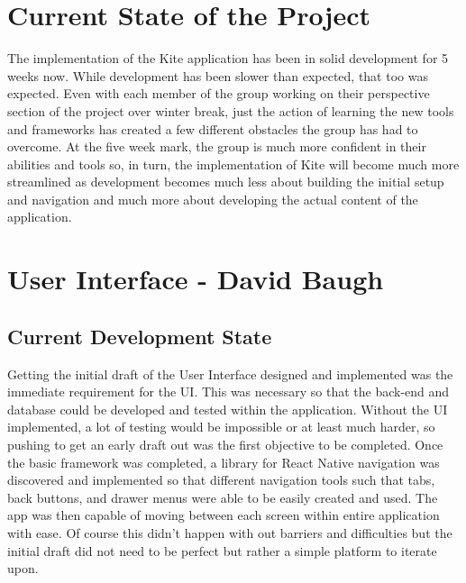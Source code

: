 \documentclass[compsoc, 10, draftclsnofoot, onecolumn]{IEEEtran}
\begin{document}
\section{Current State of the Project}

The implementation of the Kite application has been in solid development for 5 weeks now. While development has been slower than expected, that too was expected. Even with each member of the group working on their perspective section of the project over winter break, just the action of learning the new tools and frameworks has created a few different obstacles the group has had to overcome. At the five week mark, the group is much more confident in their abilities and tools so, in turn, the implementation of Kite will become much more streamlined as development becomes much less about building the initial setup and navigation and much more about developing the actual content of the application.

\section{User Interface - David Baugh}

\subsection{Current Development State}
Getting the initial draft of the User Interface designed and implemented was the immediate requirement for the UI. This was necessary so that the back-end and database could be developed and tested within the application. Without the UI implemented, a lot of testing would be impossible or at least much harder, so pushing to get an early draft out was the first objective to be completed. Once the basic framework was completed, a library for React Native navigation was discovered and implemented so that different navigation tools such that tabs, back buttons, and drawer menus were able to be easily created and used. The app was then capable of moving between each screen within entire application with ease. Of course this didn't happen with out barriers and difficulties but the initial draft did not need to be perfect but rather a simple platform to iterate upon. 
\end{document}
